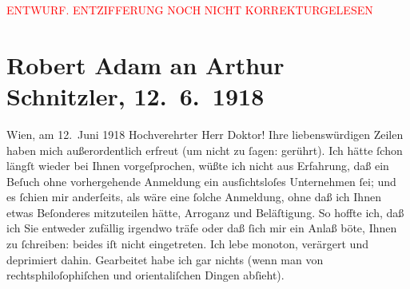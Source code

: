 
\begin{center}
            \textcolor{red}{ENTWURF. ENTZIFFERUNG NOCH NICHT KORREKTURGELESEN}
                      \end{center}
            
               \section[Robert Adam an Arthur Schnitzler, 12. 6. 1918]{ Robert Adam an Arthur Schnitzler, 12. 6. 1918}\nopagebreak{}\rehead{ }\begin{ledgroupsized}[t]{13cm}\normalsize\beginnumbering{} \toendnotes[C]{\smallbreak\pagebreak[2]} 
\toendnotes[C]{\smallbreak}\pstart
           \raggedleft{}{\pb}Wien, am 12. Juni 1918\pend
           \pstart\center{}Hochverehrter Herr Doktor!\pend\pstart
           Ihre liebenswürdigen Zeilen haben mich außerordentlich erfreut (um nicht zu
                    ſagen: gerührt). Ich hätte ſchon längſt wieder bei Ihnen vorgeſprochen, wüßte
                    ich nicht aus Erfahrung, daß ein Beſuch ohne vorhergehende Anmeldung ein
                    ausſichtsloſes Unternehmen ſei; und es ſchien mir anderſeits, als wäre eine
                    ſolche Anmeldung, ohne daß ich Ihnen etwas Beſonderes mitzuteilen hätte,
                    Arroganz und Beläſtigung. So hoffte ich, daß ich Sie entweder zufällig irgendwo
                    träfe oder daß ſich mir ein Anlaß böte, Ihnen zu ſchreiben: beides iſt nicht
                    eingetreten.\pend
           \pstart
           Ich lebe monoton, verärgert und {\pb}deprimiert dahin. Gearbeitet habe ich gar nichts (wenn man von
                    rechtsphiloſophiſchen und orientaliſchen Dingen abſieht).\pend
           \pstart

\end{ledgroupsized}
